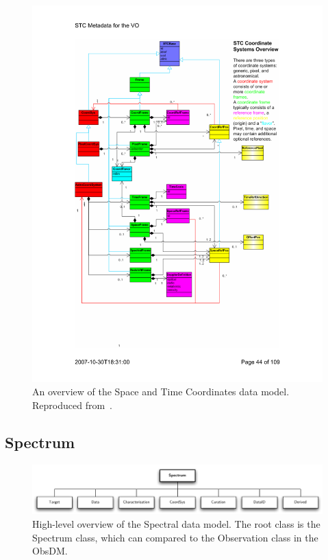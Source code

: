 			\begin{figure}[tbp]
				\centering
					\includegraphics[width=\columnwidth]
					{fig/STCDM.pdf}
				\caption[Space and Time Coordinates data model
				overview]
				{
					An overview of the Space and Time Coordinates
					data model. Reproduced 
					from~\cite{2007stc..ivoa.....R}.
				}
				\label{fig:fig_STCDM}
			\end{figure}
			
			
		
		\subsection{Spectrum} %
		\label{sub:spectrum}
			
			\begin{figure}[tbp]
				\centering
					\includegraphics[width=\columnwidth]
					{fig/SpectrumDM.pdf}
				\caption[High-level overview of the Spectral DM]
				{
					High-level overview of the Spectral data model.
					The root class is the Spectrum class, which can
					compared to the Observation class in the ObsDM.
				}
				\label{fig:fig_SpectrumDM}
			\end{figure}
			
